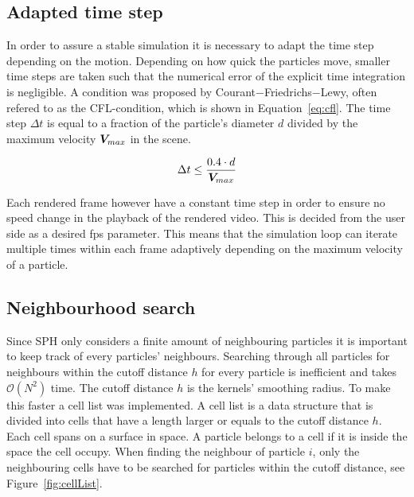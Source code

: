 \subsection{Adapted time step} \label{section:timestep}

In order to assure a stable simulation it is necessary to adapt the time step depending on the motion.
Depending on how quick the particles move, smaller time steps are taken such that the numerical error of the explicit time integration is negligible.
A condition was proposed by Courant$-$Friedrichs$-$Lewy, often refered to as the CFL-condition, which is shown in Equation~\ref{eq:cfl}.
The time step $\Delta t$ is equal to a fraction of the particle's diameter $d$ divided by 
the maximum velocity $\bm{V}_{max}$ in the scene.

\begin{equation} \label{eq:cfl}
\Delta t \leq \frac{0.4 \cdot d}{\bm{V}_{max}}
\end{equation}

Each rendered frame however have a constant time step in order to ensure no speed change in the playback of the rendered video.
This is decided from the user side as a desired fps parameter.
This means that the simulation loop can iterate multiple times within each frame adaptively depending on the maximum velocity of a particle.



\subsection{Neighbourhood search} \label{section:neighbour}
    Since SPH only considers a finite amount of neighbouring particles it is important to keep track of every particles' neighbours.
    Searching through all particles for neighbours within the cutoff distance $h$ for every particle is inefficient and takes $\mathcal{O}({N^2})$ time.
    The cutoff distance $h$ is the kernels' smoothing radius.
    To make this faster a cell list was implemented.
    A cell list is a data structure that is divided into cells that have a length larger or equals to the cutoff distance $h$.
    Each cell spans on a surface in space.
    A particle belongs to a cell if it is inside the space the cell occupy.
    When finding the neighbour of particle $i$, only the neighbouring cells have to be searched for particles within the cutoff distance, see Figure~\ref{fig:cellList}.
    
